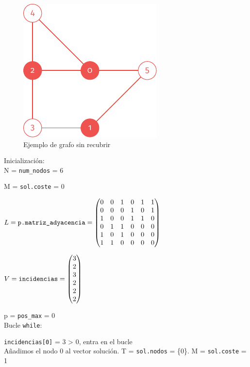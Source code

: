 \documentclass[11pt]{article}
\begin{document}
\begin{figure}[H]
	\caption{Ejemplo de grafo sin recubrir}
	\centering \includegraphics{./img/grafo-ejemplo-sin-recubrir.pdf}
\end{figure}

Inicialización:\\
N = \verb|num_nodos| = 6

M = \verb|sol.coste| = 0

$\displaystyle  L = \verb|p.matriz_adyacencia| =
\begin{pmatrix}
	0 & 0 & 1 & 0 & 1 & 1 \\
	0 & 0 & 0 & 1 & 0 & 1 \\
	1 & 0 & 0 & 1 & 1 & 0 \\
	0 & 1 & 1 & 0 & 0 & 0 \\
	1 & 0 & 1 & 0 & 0 & 0 \\
	1 & 1 & 0 & 0 & 0 & 0
\end{pmatrix}$

$\displaystyle V = \verb|incidencias| =
\begin{pmatrix}
	3 \\
	2 \\
	3 \\
	2 \\
	2 \\
	2
\end{pmatrix}$

p = \verb|pos_max| = 0\\

Bucle \verb|while|:

\verb|incidencias[0]| = 3 > 0, entra en el bucle\\
Añadimos el nodo 0 al vector solución. T = \verb|sol.nodos| = \{0\}.
M = \verb|sol.coste| = 1\\
\end{document}
